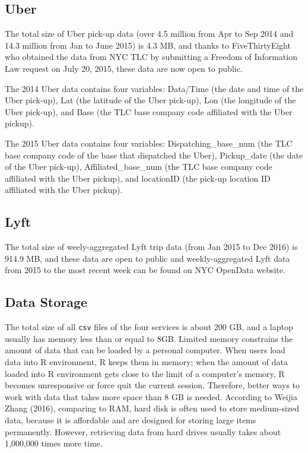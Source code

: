 \documentclass[12pt,twoside]{reedthesis}
\theoremstyle{definition}
\theoremstyle{definition}
\theoremstyle{definition}
\theoremstyle{remark}
\begin{document}
\subsection{Uber}\label{uber-1}

The total size of Uber pick-up data (over 4.5 million from Apr to Sep
2014 and 14.3 million from Jan to June 2015) is 4.3 MB, and thanks to
FiveThirtyEight who obtained the data from NYC TLC by submitting a
Freedom of Information Law request on July 20, 2015, these data are now
open to public.

The 2014 Uber data contains four variables: Data/Time (the date and time
of the Uber pick-up), Lat (the latitude of the Uber pick-up), Lon (the
longitude of the Uber pick-up), and Base (the TLC base company code
affiliated with the Uber pickup).

The 2015 Uber data contains four variables: Dispatching\_base\_num (the
TLC base company code of the base that dispatched the Uber),
Pickup\_date (the date of the Uber pick-up), Affiliated\_base\_num (the
TLC base company code affiliated with the Uber pickup), and locationID
(the pick-up location ID affiliated with the Uber pickup).

\subsection{Lyft}\label{lyft-1}

The total size of weely-aggregated Lyft trip data (from Jan 2015 to Dec
2016) is 914.9 MB, and these data are open to public and
weekly-aggregated Lyft data from 2015 to the most recent week can be
found on NYC OpenData website.

\subsection{Data Storage}\label{data-storage}

The total size of all \texttt{csv} files of the four services is about
200 GB, and a laptop usually has memory less than or equal to 8GB.
Limited memory constrains the amount of data that can be loaded by a
personal computer. When users load data into R environment, R keeps them
in memory; when the amount of data loaded into R environment gets close
to the limit of a computer's memory, R becomes unresponsive or force
quit the current session. Therefore, better ways to work with data that
takes more space than 8 GB is needed. According to Weijia Zhang (2016),
comparing to RAM, hard disk is often used to store medium-sized data,
because it is affordable and are designed for storing large items
permanently. However, retrieving data from hard drives usually takes
about 1,000,000 times more time.
\end{document}
